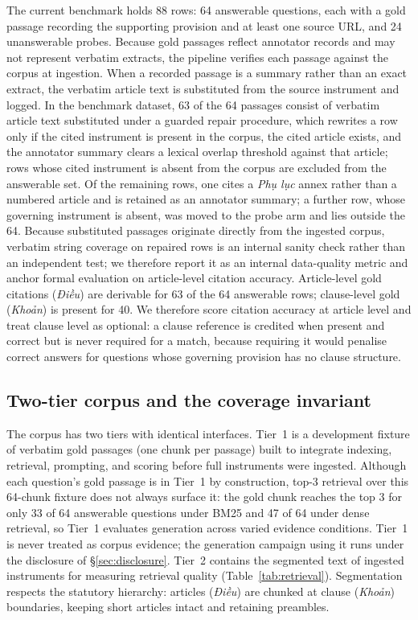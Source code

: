 \documentclass[conference,a4paper]{IEEEtran}
\begin{document}
The current benchmark holds 88 rows: 64 answerable questions, each with a gold passage recording the supporting provision and at least one source URL, and 24 unanswerable probes. Because gold passages reflect annotator records and may not represent verbatim extracts, the pipeline verifies each passage against the corpus at ingestion. When a recorded passage is a summary rather than an exact extract, the verbatim article text is substituted from the source instrument and logged. In the benchmark dataset, 63 of the 64 passages consist of verbatim article text substituted under a guarded repair procedure, which rewrites a row only if the cited instrument is present in the corpus, the cited article exists, and the annotator summary clears a lexical overlap threshold against that article; rows whose cited instrument is absent from the corpus are excluded from the answerable set. Of the remaining rows, one cites a \emph{Phụ lục} annex rather than a numbered article and is retained as an annotator summary; a further row, whose governing instrument is absent, was moved to the probe arm and lies outside the 64. Because substituted passages originate directly from the ingested corpus, verbatim string coverage on repaired rows is an internal sanity check rather than an independent test; we therefore report it as an internal data-quality metric and anchor formal evaluation on article-level citation accuracy.
Article-level gold citations (\emph{Điều}) are derivable for 63 of the 64 answerable rows; clause-level gold (\emph{Khoản}) is present for 40. We therefore score citation accuracy at article level and treat clause level as optional: a clause reference is credited when present and correct but is never required for a match, because requiring it would penalise correct answers for questions whose governing provision has no clause structure.

\subsection{Two-tier corpus and the coverage invariant}
The corpus has two tiers with identical interfaces. Tier~1 is a development fixture of verbatim gold passages (one chunk per passage) built to integrate indexing, retrieval, prompting, and scoring before full instruments were ingested. Although each question's gold passage is in Tier~1 by construction, top-3 retrieval over this 64-chunk fixture does not always surface it: the gold chunk reaches the top 3 for only 33 of 64 answerable questions under BM25 and 47 of 64 under dense retrieval, so Tier~1 evaluates generation across varied evidence conditions. Tier~1 is never treated as corpus evidence; the generation campaign using it runs under the disclosure of \S\ref{sec:disclosure}. Tier~2 contains the segmented text of ingested instruments for measuring retrieval quality (Table~\ref{tab:retrieval}). Segmentation respects the statutory hierarchy: articles (\emph{Điều}) are chunked at clause (\emph{Khoản}) boundaries, keeping short articles intact and retaining preambles.
\end{document}
